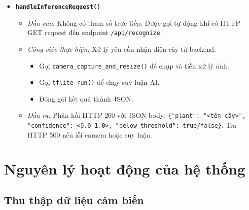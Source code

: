 \documentclass[12pt,a4paper]{report}
\begin{document}
\begin{itemize}
    \item \textbf{\texttt{handleInferenceRequest()}}
    \begin{itemize}
        \item \textit{Đầu vào:} Không có tham số trực tiếp. Được gọi tự động khi
        có HTTP GET request đến endpoint \texttt{/api/recognize}.
        \item \textit{Công việc thực hiện:} Xử lý yêu cầu nhận diện cây từ backend:
        \begin{itemize}
            \item Gọi \texttt{camera\_capture\_and\_resize()} để chụp và tiền xử
            lý ảnh.
            \item Gọi \texttt{tflite\_run()} để chạy suy luận AI.
            \item Đóng gói kết quả thành JSON.
        \end{itemize}
        \item \textit{Đầu ra:} Phản hồi HTTP 200 với JSON body:
        \texttt{\{"plant": "<tên cây>", "confidence": <0.0--1.0>,
        "below\_threshold": true/false\}}. Trả HTTP 500 nếu lỗi camera hoặc suy
        luận.
    \end{itemize}
\end{itemize}


\section{Nguyên lý hoạt động của hệ thống}

\subsection{Thu thập dữ liệu cảm biến}
\end{document}
